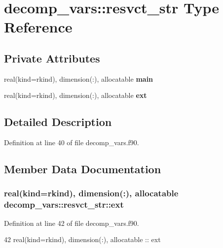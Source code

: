 \section{decomp\+\_\+vars\+:\+:resvct\+\_\+str Type Reference}
\label{structdecomp__vars_1_1resvct__str}
\subsection*{Private Attributes}
\begin{DoxyCompactItemize}
\item 
real(kind=rkind), dimension(\+:), allocatable {\bf main}
\item 
real(kind=rkind), dimension(\+:), allocatable {\bf ext}
\end{DoxyCompactItemize}


\subsection{Detailed Description}


Definition at line 40 of file decomp\+\_\+vars.\+f90.



\subsection{Member Data Documentation}
\subsubsection[{ext}]{\setlength{\rightskip}{0pt plus 5cm}real(kind=rkind), dimension(\+:), allocatable decomp\+\_\+vars\+::resvct\+\_\+str\+::ext\hspace{0.3cm}{\ttfamily [private]}}\label{structdecomp__vars_1_1resvct__str_a88228d41c0f74278f16a1690e589f55a}


Definition at line 42 of file decomp\+\_\+vars.\+f90.


\begin{DoxyCode}
42     \textcolor{keywordtype}{real(kind=rkind)}, \textcolor{keywordtype}{dimension(:)}, \textcolor{keywordtype}{allocatable} :: ext
\end{DoxyCode}
